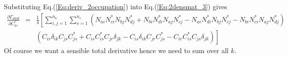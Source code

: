 \documentclass[pra]{revtex4-1}
\begin{document}
Substituting Eq.(\ref{Eq:deriv_2occupation}) into Eq.(\ref{Eq:2densmat_3}) gives
\begin{eqnarray}
  \frac{\partial\Gamma_{abcd}}{\partial C^*_{kr}}
  &=& \frac{1}{4}\left[\sum_{i,j=1}^{n_b}\sum_{s=1}^{n_e}\left(
      N_{ai}N^*_{ci}N_{bj}N^*_{dj}+N_{bi}N^*_{di}N_{aj}N^*_{cj}
      -N_{ai}N^*_{di}N_{bj}N^*_{cj}-N_{bi}N^*_{ci}N_{aj}N^*_{dj}\right)\right.
      \nonumber \\
  &&  \left.\left(C_{ir}\delta_{ik}C_{js}C^*_{js}+C_{is}C^*_{is}C_{jr}\delta_{jk}
      -C_{is}\delta_{ik}C_{jr}C^*_{js}-C_{ir}C^*_{is}C_{js}\delta_{jk}\right)\right]
\end{eqnarray}
Of course we want a sensible total derivative hence we need to sum over all $k$. 
\end{document}
